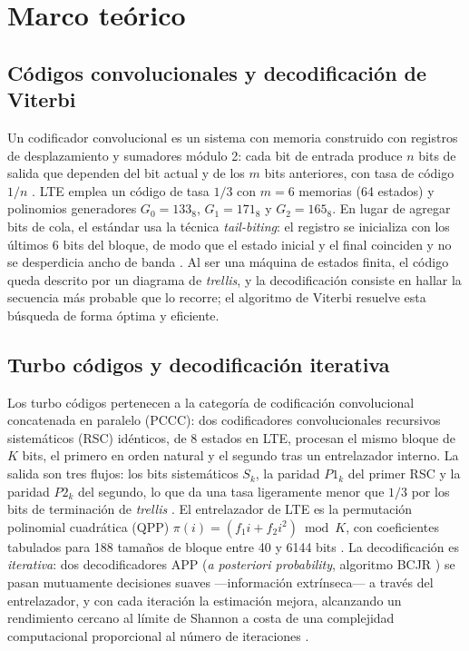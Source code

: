 \documentclass[conference,onecolumn]{IEEEtran}
\begin{document}
\section{Marco teórico}

\subsection{Códigos convolucionales y decodificación de Viterbi}

Un codificador convolucional es un sistema con memoria construido con registros de desplazamiento
y sumadores módulo 2: cada bit de entrada produce $n$ bits de salida que dependen del bit actual y
de los $m$ bits anteriores, con tasa de código $1/n$ \cite{vazquez2024}. LTE emplea un código de
tasa $1/3$ con $m=6$ memorias (64 estados) y polinomios generadores $G_0=133_8$, $G_1=171_8$ y
$G_2=165_8$. En lugar de agregar bits de cola, el estándar usa la técnica
\textit{tail-biting}: el registro se inicializa con los últimos 6 bits del bloque, de modo que el
estado inicial y el final coinciden y no se desperdicia ancho de banda \cite{ts36212}. Al ser una
máquina de estados finita, el código queda descrito por un diagrama de \textit{trellis}, y la
decodificación consiste en hallar la secuencia más probable que lo recorre; el algoritmo de
Viterbi \cite{viterbi1967} resuelve esta búsqueda de forma óptima y eficiente.

\subsection{Turbo códigos y decodificación iterativa}

Los turbo códigos \cite{berrou1993} pertenecen a la categoría de codificación convolucional
concatenada en paralelo (PCCC): dos codificadores convolucionales recursivos sistemáticos (RSC)
idénticos, de 8 estados en LTE, procesan el mismo bloque de $K$ bits, el primero en orden natural
y el segundo tras un entrelazador interno. La salida son tres flujos: los bits sistemáticos
$S_k$, la paridad $P1_k$ del primer RSC y la paridad $P2_k$ del segundo, lo que da una tasa
ligeramente menor que $1/3$ por los bits de terminación de \textit{trellis}
\cite{vazquez2024}. El entrelazador de LTE es la permutación polinomial cuadrática (QPP)
$\pi(i)=(f_1 i+f_2 i^2)\bmod K$, con coeficientes tabulados para 188 tamaños de bloque entre 40 y
6144 bits \cite{ts36212}. La decodificación es \emph{iterativa}: dos decodificadores APP
(\textit{a posteriori probability}, algoritmo BCJR \cite{bcjr1974}) se pasan mutuamente decisiones
suaves ---información extrínseca--- a través del entrelazador, y con cada iteración la estimación
mejora, alcanzando un rendimiento cercano al límite de Shannon a costa de una complejidad
computacional proporcional al número de iteraciones \cite{dahlman2014}.
\end{document}
